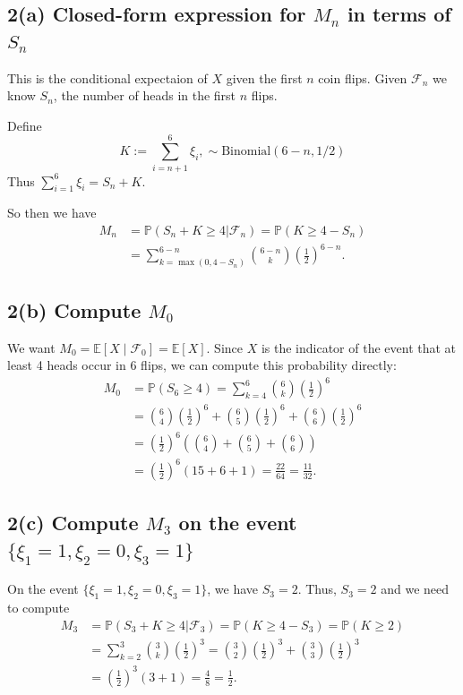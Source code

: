 \documentclass[answers,12pt,addpoints]{exam}
\begin{document}
\subsection*{2(a) Closed-form expression for \texorpdfstring{$M_n$}{Mn} in terms of \texorpdfstring{$S_n$}{Sn}}

This is the conditional expectaion of $X$ given the first $n$ coin flips. Given $\mathcal{F}_n$ we know $S_n$, the number of heads in the first $n$ flips. 

Define
$$ K := \sum_{i=n+1}^6 \xi_i, \sim \text{Binomial}(6-n, 1/2)$$
Thus $\sum_{i=1}^6 \xi_i = S_n + K$.

So then we have
\begin{align*}
    M_n &= \mathbb{P}(S_n + K \geq 4 | \mathcal{F}_n) = \mathbb{P}(K \geq 4 - S_n) \\
    &= \sum_{k = \max(0, 4 - S_n)}^{6-n} \binom{6-n}{k} \left(\frac{1}{2}\right)^{6-n}.
\end{align*}

\subsection*{2(b) Compute \texorpdfstring{$M_0$}{M0}}

We want $M_0 = \mathbb{E}[X \mid \mathcal{F}_0] = \mathbb{E}[X]$. Since $X$ is the indicator of the event that at least 4 heads occur in 6 flips, we can compute this probability directly:
\begin{align*}
M_0 &= \mathbb{P}(S_6 \geq 4) = \sum_{k=4}^6 \binom{6}{k} \left(\frac{1}{2}\right)^6 \\
&= \binom{6}{4} \left(\frac{1}{2}\right)^6 + \binom{6}{5} \left(\frac{1}{2}\right)^6 + \binom{6}{6} \left(\frac{1}{2}\right)^6 \\
&= \left(\frac{1}{2}\right)^6 \left( \binom{6}{4} + \binom{6}{5} + \binom{6}{6} \right) \\
&= \left(\frac{1}{2}\right)^6 (15 + 6 + 1) = \frac{22}{64} = \frac{11}{32}.
\end{align*}

\subsection*{2(c) Compute \texorpdfstring{$M_3$}{M3} on the event $\{\xi_1 = 1, \xi_2 = 0, \xi_3 = 1\}$}

On the event $\{\xi_1 = 1, \xi_2 = 0, \xi_3 = 1\}$, we have $S_3 = 2$. Thus, $S_3 = 2$ and we need to compute
\begin{align*}
M_3 &= \mathbb{P}(S_3 + K \geq 4 | \mathcal{F}_3) = \mathbb{P}(K \geq 4 - S_3) = \mathbb{P}(K \geq 2) \\
&= \sum_{k=2}^{3} \binom{3}{k} \left(\frac{1}{2}\right)^3 = \binom{3}{2} \left(\frac{1}{2}\right)^3 + \binom{3}{3} \left(\frac{1}{2}\right)^3 \\
&= \left(\frac{1}{2}\right)^3 (3 + 1) = \frac{4}{8} = \frac{1}{2}.
\end{align*}
\end{document}
